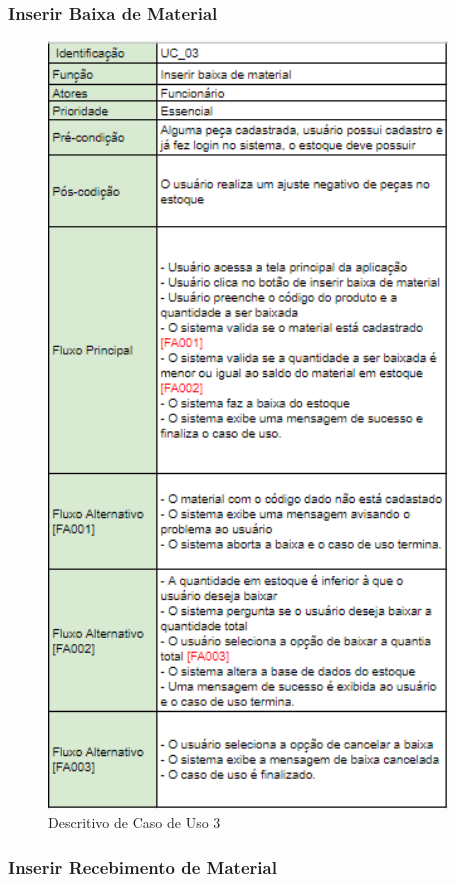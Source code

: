 \documentclass[rascunho,xindy,acronym,symbols]{fei}
\begin{document}
\subsubsection{Inserir Baixa de Material}

\begin{figure}[H]
    \centering
    \includegraphics[scale=0.6, width=300pt]{./Images/Descritivos/UC3.png}
    \caption{Descritivo de Caso de Uso 3}
     \label{fig:desc_uc3}
\end{figure}

\subsubsection{Inserir Recebimento de Material}
\end{document}
